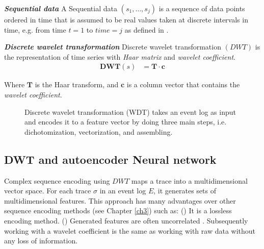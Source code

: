 \begin{definition}{\textit{\textbf{Sequential data}}}
	A Sequential data $(s_1, \dots, s_j)$ is a sequence of data points ordered in time that is assumed to be real values taken at discrete intervals in time, e.g. from time $t=1$ to $time=j$ as defined in \cite{shumway2017time}.

\end{definition} 

\begin{definition}{\textit{\textbf{Discrete wavelet transformation}}}
	Discrete wavelet transformation $(DWT)$ is the representation of time series with \textit{Haar matrix} and \textit{wavelet coefficient}. 
		\begin{equation} \label{eq4}
	\begin{split}
	\textbf{DWT}(s) & = \textbf{T} \cdot \textbf{c}
	\end{split}
	\end{equation}
	
	Where $\textbf{T}$ is the Haar transform, and $\textbf{c}$ is a column vector that contains the \textit{wavelet coefficient}.	
\end{definition}
 
\begin{figure}[htb]
	\begin{center}
		\caption[Discrete wavelet transformation (DWT)]{Discrete wavelet transformation (WDT) takes an event log as input and encodes it to a feature vector by doing three main steps, i.e. dichotomization, vectorization, and assembling.}
		\label{fig:dwt4}
	\end{center}
\end{figure}

\subsection{DWT and autoencoder Neural network}
Complex sequence encoding using $DWT$ maps a trace into a multidimensional vector space. For each trace $\sigma$ in an event log $E$, it generates sets of multidimensional features. This approach has many advantages over other sequence encoding methods (see Chapter \ref{ch3}) such as: () It is a lossless encoding method. () Generated features are often uncorrelated \cite{aggarwal2015data, bakshi1999multiscale}. Subsequently working with a wavelet coefficient is the same as working with raw data without any loss of information. 


